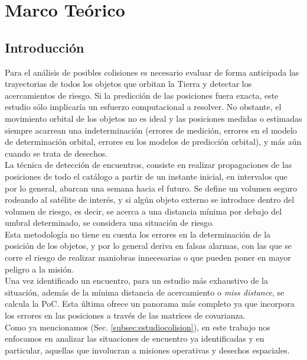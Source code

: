 \chapter{Marco Teórico}
\label{chap:marcoteorico}

\section{Introducci\'on}

Para el an\'alisis de posibles colisiones es necesario evaluar de forma anticipada las trayectorias de todos los objetos que orbitan la Tierra y detectar los acercamientos de riesgo. Si la predicci\'on de las posiciones fuera exacta, este estudio s\'olo implicar\'ia un esfuerzo computacional a resolver. No obstante, el movimiento orbital de los objetos no es ideal y las posiciones medidas o estimadas siempre acarrean una indeterminaci\'on (errores de medici\'on, errores en el modelo de determinaci\'on orbital, errores en los modelos de predicci\'on orbital), y m\'as a\'un cuando se trata de desechos.\\

La t\'ecnica de detecci\'on de encuentros, consiste en realizar propagaciones de las posiciones de todo el cat\'alogo a partir de un instante inicial, en intervalos que por lo general, abarcan una semana hacia el futuro. Se define un volumen seguro rodeando al sat\'elite de inter\'es, y si alg\'un objeto externo se introduce dentro del volumen de riesgo, es decir, se acerca a una distancia m\'inima por debajo del umbral determinado, se considera una situaci\'on de riesgo.\\ 
Esta metodolog\'ia no tiene en cuenta los errores en la determinaci\'on de la posici\'on de los objetos, y por lo general deriva en falsas alarmas, con las que se corre el riesgo de realizar maniobras innecesarias o que pueden poner en mayor peligro a la misi\'on.\\
Una vez identificado un encuentro, para un estudio m\'as exhaustivo de la situaci\'on, adem\'as de la m\'inima distancia de acercamiento o {\it{miss distance}}, se calcula la PoC.  Esta \'ultima ofrece un panorama m\'as completo ya que incorpora los errores en las posiciones a trav\'es de las matrices de covarianza.\\

Como ya mencionamos (Sec. \ref{subsec:estudiocolision}), en este trabajo nos enfocamos en analizar las situaciones de encuentro ya identificadas y en particular, aquellas que involucran a misiones operativas y desechos espaciales.\\

